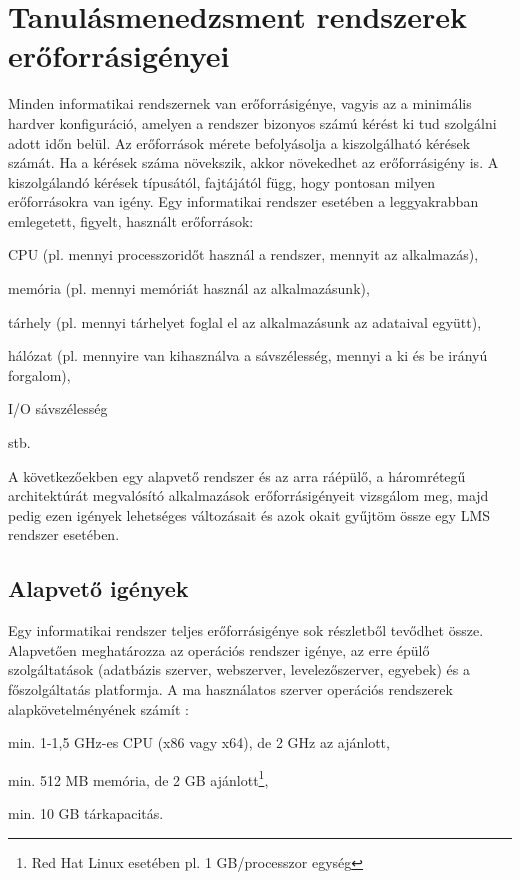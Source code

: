 \chapter{Tanulásmenedzsment rendszerek erőforrásigényei}

Minden informatikai rendszernek van erőforrásigénye, vagyis az a minimális hardver konfiguráció, amelyen a rendszer bizonyos számú kérést ki tud szolgálni adott időn belül. Az erőforrások mérete befolyásolja a kiszolgálható kérések számát. Ha a kérések száma növekszik, akkor növekedhet az erőforrásigény is. A kiszolgálandó kérések típusától, fajtájától függ, hogy pontosan milyen erőforrásokra van igény.
Egy informatikai rendszer esetében a leggyakrabban emlegetett, figyelt, használt erőforrások:
\begin{sajat_itemize}
\item CPU (pl. mennyi processzoridőt használ a rendszer, mennyit az alkalmazás),
\item memória (pl. mennyi memóriát használ az alkalmazásunk),
\item tárhely (pl. mennyi tárhelyet foglal el az alkalmazásunk az adataival együtt),
\item hálózat (pl. mennyire van kihasználva a sávszélesség, mennyi a ki és be irányú forgalom),
\item I/O sávszélesség
\item stb.
\end{sajat_itemize}

A következőekben egy alapvető rendszer és az arra ráépülő, a háromrétegű architektúrát megvalósító alkalmazások erőforrásigényeit vizsgálom meg, majd pedig ezen igények lehetséges változásait és azok okait gyűjtöm össze egy LMS rendszer esetében. 

\section{Alapvető igények}

Egy informatikai rendszer teljes erőforrásigénye sok részletből tevődhet össze. Alapvetően meghatározza az operációs rendszer igénye, az erre épülő szolgáltatások (adatbázis szerver, webszerver, levelezőszerver, egyebek) és a főszolgáltatás platformja.
A ma használatos szerver operációs rendszerek alapkövetelményének számít \cite{ws2008sr,ubuntuminhr,redhatcaplim}:

\begin{sajat_itemize}
\item min. 1-1,5 GHz-es CPU (x86 vagy x64), de 2 GHz az ajánlott,
\item min. 512 MB memória, de 2 GB ajánlott\footnote{Red Hat Linux esetében pl. 1 GB/processzor egység},
\item min. 10 GB tárkapacitás.
\end{sajat_itemize}

